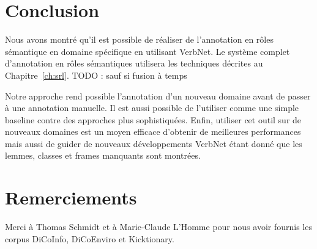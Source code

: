 \section*{Conclusion}

Nous avons montré qu'il est possible de réaliser de l'annotation en rôles
sémantique en domaine spécifique en utilisant VerbNet. Le système complet
d'annotation en rôles sémantiques utilisera les techniques décrites au
Chapitre~\ref{ch:srl}. TODO : sauf si fusion à temps

Notre approche rend possible l'annotation d'un nouveau domaine avant de passer
à une annotation manuelle. Il est aussi possible de l'utiliser comme une simple
baseline contre des approches plus sophistiquées. Enfin, utiliser cet outil sur
de nouveaux domaines est un moyen efficace d'obtenir de meilleures performances
mais aussi de guider de nouveaux développements VerbNet étant donné que les
lemmes, classes et frames manquants sont montrées.

\section*{Remerciements}

Merci à Thomas Schmidt et à Marie-Claude L'Homme pour nous avoir fournis les
corpus DiCoInfo, DiCoEnviro et Kicktionary.

